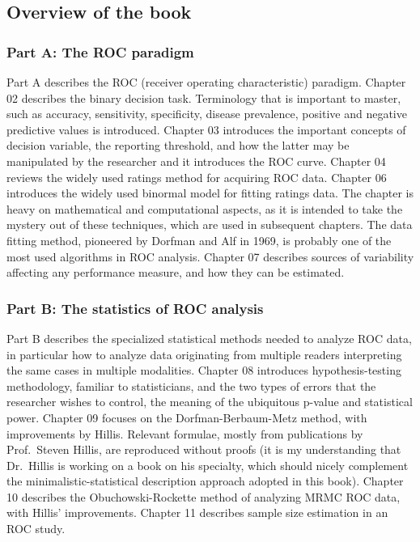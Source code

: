 \documentclass[
]{book}
\begin{document}
\hypertarget{overview-of-the-book}{%
\subsection{Overview of the book}\label{overview-of-the-book}}

\hypertarget{part-a-the-roc-paradigm}{%
\subsubsection{Part A: The ROC paradigm}\label{part-a-the-roc-paradigm}}

Part A describes the ROC (receiver operating characteristic) paradigm. Chapter 02 describes the binary decision task. Terminology that is important to master, such as accuracy, sensitivity, specificity, disease prevalence, positive and negative predictive values is introduced. Chapter 03 introduces the important concepts of decision variable, the reporting threshold, and how the latter may be manipulated by the researcher and it introduces the ROC curve. Chapter 04 reviews the widely used ratings method for acquiring ROC data. Chapter 06 introduces the widely used binormal model for fitting ratings data. The chapter is heavy on mathematical and computational aspects, as it is intended to take the mystery out of these techniques, which are used in subsequent chapters. The data fitting method, pioneered by Dorfman and Alf in 1969, is probably one of the most used algorithms in ROC analysis. Chapter 07 describes sources of variability affecting any performance measure, and how they can be estimated.

\hypertarget{part-b-the-statistics-of-roc-analysis}{%
\subsubsection{Part B: The statistics of ROC analysis}\label{part-b-the-statistics-of-roc-analysis}}

Part B describes the specialized statistical methods needed to analyze ROC data, in particular how to analyze data originating from multiple readers interpreting the same cases in multiple modalities. Chapter 08 introduces hypothesis-testing methodology, familiar to statisticians, and the two types of errors that the researcher wishes to control, the meaning of the ubiquitous p-value and statistical power. Chapter 09 focuses on the Dorfman-Berbaum-Metz method, with improvements by Hillis. Relevant formulae, mostly from publications by Prof.~Steven Hillis, are reproduced without proofs (it is my understanding that Dr.~Hillis is working on a book on his specialty, which should nicely complement the minimalistic-statistical description approach adopted in this book). Chapter 10 describes the Obuchowski-Rockette method of analyzing MRMC ROC data, with Hillis' improvements. Chapter 11 describes sample size estimation in an ROC study.
\end{document}
